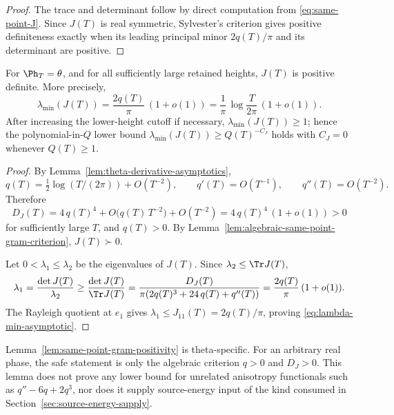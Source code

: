 \begin{proof}
The trace and determinant follow by direct computation from
\eqref{eq:same-point-J}.  Since \(J(T)\) is real symmetric,
Sylvester's criterion gives positive definiteness exactly when its
leading principal minor \(2q(T)/\pi\) and its determinant are
positive.
\end{proof}

\begin{lemma}
\label{lem:same-point-gram-positivity}
For \(\Ph_T = \theta\), and for all sufficiently large retained
heights, \(J(T)\) is positive definite.  More precisely,
\begin{equation}
\label{eq:lambda-min-asymptotic}
        \lambda_{\min}(J(T))
        = \frac{2 q(T)}{\pi}\,(1 + o(1))
        = \frac{1}{\pi}\,\log\frac{T}{2\pi}\,(1 + o(1)).
\end{equation}
After increasing the lower-height cutoff if necessary,
\(\lambda_{\min}(J(T)) \ge 1\); hence the polynomial-in-\(Q\) lower
bound \(\lambda_{\min}(J(T)) \ge Q(T)^{-C_J}\) holds with \(C_J = 0\)
whenever \(Q(T) \ge 1\).
\end{lemma}

\begin{proof}
By Lemma~\ref{lem:theta-derivative-asymptotics},
\[
q(T) = \tfrac12 \log(T/(2\pi)) + O(T^{-2}),\qquad
q'(T) = O(T^{-1}),\qquad q''(T) = O(T^{-2}).
\]
Therefore
\[
D_J(T) = 4\,q(T)^4 + O\!\bigl(q(T)\,T^{-2}\bigr) + O(T^{-2})
       = 4\,q(T)^4\,(1 + o(1)) > 0
\]
for sufficiently large \(T\), and \(q(T) > 0\).  By
Lemma~\ref{lem:algebraic-same-point-gram-criterion},
\(J(T) \succ 0\).

Let \(0 < \lambda_1 \le \lambda_2\) be the eigenvalues of \(J(T)\).
Since \(\lambda_2 \le \Tr J(T)\),
\[
\lambda_1 = \frac{\det J(T)}{\lambda_2}
          \ge \frac{\det J(T)}{\Tr J(T)}
          = \frac{D_J(T)}{\pi(2 q(T)^3 + 24\,q(T) + q''(T))}
          = \frac{2 q(T)}{\pi}\,(1 + o(1)).
\]
The Rayleigh quotient at \(e_1\) gives
\(\lambda_1 \le J_{11}(T) = 2 q(T)/\pi\), proving
\eqref{eq:lambda-min-asymptotic}.
\end{proof}

\begin{remark}
\label{rem:scope-of-gram-positivity}
Lemma~\ref{lem:same-point-gram-positivity} is theta-specific.  For an
arbitrary real phase, the safe statement is only the algebraic
criterion \(q > 0\) and \(D_J > 0\).  This lemma does not prove any
lower bound for unrelated anisotropy functionals such as
\(q'' - 6q + 2q^3\), nor does it supply source-energy input of the
kind consumed in Section~\ref{sec:source-energy-supply}.
\end{remark}
